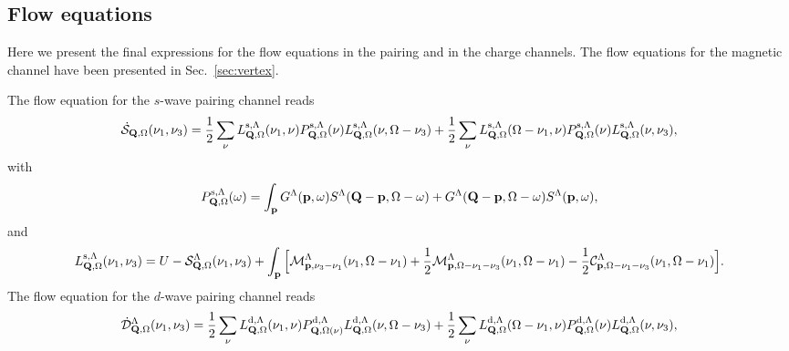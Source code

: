 
\begin{widetext}

\section{Flow equations}
\label{sec:FlowEquations}

Here we present the final expressions for the flow equations in the pairing and in the charge channels. The flow equations for the magnetic channel have been presented in
Sec.~\ref{sec:vertex}.

The flow equation for the $s$-wave pairing channel reads
\begin{equation}
\dot{\mathcal{S}}_{\mathbf{Q},\Omega}(\nu_1,\nu_3) = 
  \frac{1}{2} \sum_\nu L^{\mathrm{s},\Lambda}_{\mathbf{Q},\Omega}(\nu_1,\nu) P^{\mathrm{s},\Lambda}_{\mathbf{Q},\Omega}(\nu)
  L^{\mathrm{s},\Lambda}_{\mathbf{Q},\Omega}(\nu,\Omega-\nu_3) +
 \frac{1}{2} \sum_\nu L^{\mathrm{s},\Lambda}_{\mathbf{Q},\Omega}(\Omega-\nu_1,\nu)
 P^{\mathrm{s},\Lambda}_{\mathbf{Q},\Omega}(\nu)
 L^{\mathrm{s},\Lambda}_{\mathbf{Q},\Omega}(\nu,\nu_3),
\end{equation}  
with
\begin{equation}
 P^{\mathrm{s},\Lambda}_{\mathbf{Q},\Omega}(\omega) = \int_{\mathbf{p}}
 G^{\Lambda}(\mathbf{p},\omega)S^{\Lambda}(\mathbf{Q}-\mathbf{p},\Omega-\omega) +
 G^{\Lambda}(\mathbf{Q}-\mathbf{p},\Omega-\omega) S^{\Lambda}(\mathbf{p},\omega), 
\label{eq:app:P_pp}
\end{equation} 
and
\begin{align} 
\label{eq:Lswave}
 L^{\mathrm{s},\Lambda}_{\mathbf{Q},\Omega}(\nu_1,\nu_3) = U-\mathcal{S}^{\Lambda}_{\mathbf{Q},\Omega} (\nu_1,\nu_3) +
 \int_{\mathbf{p}} \Big[ \mathcal{M}^{\Lambda}_{\mathbf{p},\nu_3-\nu_1}(\nu_1,\Omega-\nu_1) + \frac{1}{2} \mathcal{M}^{\Lambda}_{\mathbf{p},\Omega-\nu_1-\nu_3}(\nu_1,\Omega-\nu_1) -
 \frac{1}{2} \mathcal{C}^{\Lambda}_{\mathbf{p},\Omega-\nu_1-\nu_3}(\nu_1,\Omega-\nu_1) \Big]. 
\end{align}	 
The flow equation for the $d$-wave pairing channel reads
\begin{equation}
 \dot{\mathcal{D}}^{\Lambda}_{\bs{Q},\Omega}(\nu_1,\nu_3) = 
 \frac{1}{2} \sum_\nu L^{\mathrm{d},\Lambda}_{\bs{Q},\Omega}(\nu_1,\nu)
 P^{\mathrm{d},\Lambda}_{\bs{Q},\Omega(\nu)}
 L^{\mathrm{d},\Lambda}_{\bs{Q},\Omega} (\nu,\Omega-\nu_3) + 
 \frac{1}{2} \sum_\nu L^{\mathrm{d},\Lambda}_{\bs{Q},\Omega}(\Omega-\nu_1,\nu)
 P^{\mathrm{d},\Lambda}_{\bs{Q},\Omega}(\nu)
 L^{\mathrm{d},\Lambda}_{\bs{Q},\Omega}(\nu,\nu_3),

\end{equation}
\end{widetext}
